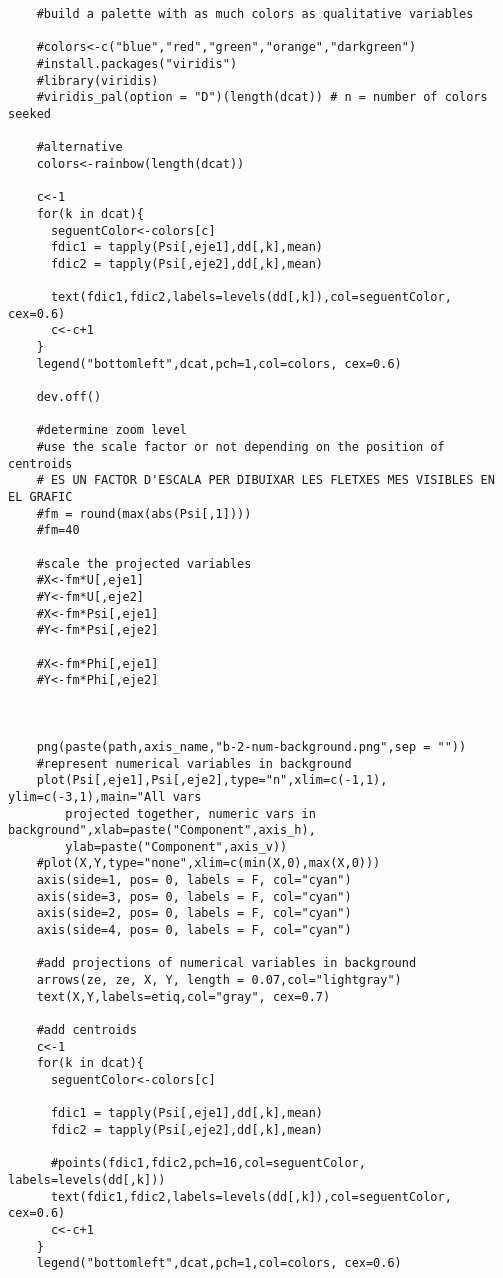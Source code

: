 \begin{verbatim}
    #build a palette with as much colors as qualitative variables
    
    #colors<-c("blue","red","green","orange","darkgreen")
    #install.packages("viridis")
    #library(viridis)
    #viridis_pal(option = "D")(length(dcat)) # n = number of colors seeked
    
    #alternative
    colors<-rainbow(length(dcat))
    
    c<-1
    for(k in dcat){
      seguentColor<-colors[c]
      fdic1 = tapply(Psi[,eje1],dd[,k],mean)
      fdic2 = tapply(Psi[,eje2],dd[,k],mean)
      
      text(fdic1,fdic2,labels=levels(dd[,k]),col=seguentColor, cex=0.6)
      c<-c+1
    }
    legend("bottomleft",dcat,pch=1,col=colors, cex=0.6)
    
    dev.off()
    
    #determine zoom level
    #use the scale factor or not depending on the position of centroids
    # ES UN FACTOR D'ESCALA PER DIBUIXAR LES FLETXES MES VISIBLES EN EL GRAFIC
    #fm = round(max(abs(Psi[,1])))
    #fm=40
    
    #scale the projected variables
    #X<-fm*U[,eje1]
    #Y<-fm*U[,eje2]
    #X<-fm*Psi[,eje1]
    #Y<-fm*Psi[,eje2]
    
    #X<-fm*Phi[,eje1]
    #Y<-fm*Phi[,eje2]
    
   
    
    png(paste(path,axis_name,"b-2-num-background.png",sep = ""))
    #represent numerical variables in background
    plot(Psi[,eje1],Psi[,eje2],type="n",xlim=c(-1,1), ylim=c(-3,1),main="All vars
        projected together, numeric vars in background",xlab=paste("Component",axis_h),
        ylab=paste("Component",axis_v))
    #plot(X,Y,type="none",xlim=c(min(X,0),max(X,0)))
    axis(side=1, pos= 0, labels = F, col="cyan")
    axis(side=3, pos= 0, labels = F, col="cyan")
    axis(side=2, pos= 0, labels = F, col="cyan")
    axis(side=4, pos= 0, labels = F, col="cyan")
    
    #add projections of numerical variables in background
    arrows(ze, ze, X, Y, length = 0.07,col="lightgray")
    text(X,Y,labels=etiq,col="gray", cex=0.7)
    
    #add centroids
    c<-1
    for(k in dcat){
      seguentColor<-colors[c]
      
      fdic1 = tapply(Psi[,eje1],dd[,k],mean)
      fdic2 = tapply(Psi[,eje2],dd[,k],mean)
      
      #points(fdic1,fdic2,pch=16,col=seguentColor, labels=levels(dd[,k]))
      text(fdic1,fdic2,labels=levels(dd[,k]),col=seguentColor, cex=0.6)
      c<-c+1
    }
    legend("bottomleft",dcat,pch=1,col=colors, cex=0.6)
    

\end{verbatim}
